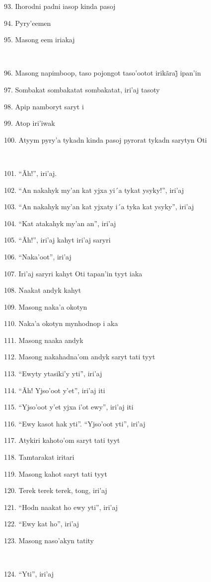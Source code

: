 93. Ihorodni padni iasop kinda pasoj

94. Pyry'eemen

95. Masong eem iriakaj

~

96. Masong napimboop, taso pojongot taso’ootot irikãraj̃ ipan’in

97. Sombakat sombakatat sombakatat, iri'aj tasoty

98. Apip namboryt saryt i

99. Atop iri'iwak

100. Atyym pyry'a tykadn kinda pasoj pyrorat tykadn sarytyn Oti

~

101. ``Ãh!'', iri'aj.

102. ``An nakahyk my'an kat yjxa yi´a tykat ysyky!'', iri'aj

103. ``An nakahyk my'an kat yjxaty i´a tyka kat ysyky'', iri'aj

104. ``Kat atakahyk my'an an'', iri'aj

105. ``Ãh!'', iri'aj kahyt iri'aj saryri

106. ``Naka'oot'', iri'aj

107. Iri'aj saryri kahyt Oti tapan'in tyyt iaka

108. Naakat andyk kahyt

109. Masong naka'a okotyn

110. Naka'a okotyn mynhodnop i aka

111. Masong naaka andyk

112. Masong nakahadna'om andyk saryt tati tyyt

113. ``Ewyty ytasiki'y yti'', iri'aj

114. ``Ãh! Yjso'oot y'et'', iri'aj iti

115. ``Yjso'oot y'et yjxa i'ot ewy'', iri'aj iti

116. ``Ewy kasot hak yti''.  ``Yjso'oot yti'', iri'aj

117. Atykiri kahoto'om saryt tati tyyt

118. Tamtarakat iritari

119. Masong kahot saryt tati tyyt

120. Terek terek terek, tong, iri'aj

121. ``Hodn naakat ho ewy yti'', iri'aj

122. ``Ewy kat ho'', iri'aj

123. Masong naso'akyn tatity

~

124. ``Yti'', iri'aj

